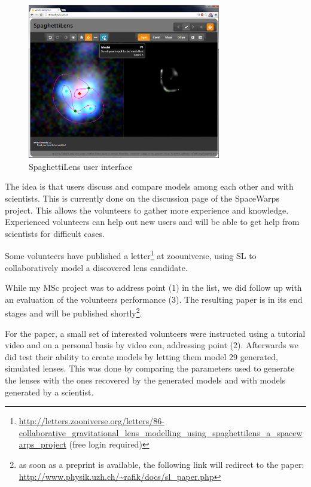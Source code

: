 \documentclass[11pt]{article}
\begin{document}
\begin{figure}
	\centering
		\includegraphics[width=0.75\textwidth]{img/client_screen.png}
	\caption{SpaghettiLens user interface}
	\label{fig:client_screen}
\end{figure}


The idea is that users discuss and compare models among each other and with scientists.
This is currently done on the discussion page of the SpaceWarps project.
This allows the volunteers to gather more experience and knowledge.
Experienced volunteers can help out new users and will be able to get help from scientists for difficult cases.

Some volunteers have published a letter\footnote{\url{http://letters.zooniverse.org/letters/86-collaborative_gravitational_lens_modelling_using_spaghettilens_a_spacewarps_project} (free login required)} at zoouniverse, using SL to collaboratively model a discovered lens candidate.

While my MSc project was to address point (1) in the list, we did follow up with an evaluation of the volunteers performance (3).
The resulting paper is in its end stages and will be published shortly\footnote{as soon as a preprint is available, the following link will redirect to the paper:
\url{http://www.physik.uzh.ch/~rafik/docs/sl_paper.php}}.

For the paper, a small set of interested volunteers were instructed using a tutorial video and on a personal basis by video con, addressing point (2).
Afterwards we did test their ability to create models by letting them model 29 generated, simulated lenses.
This was done by comparing the parameters used to generate the lenses with the ones recovered by the generated models and with models generated by a scientist.
\end{document}
